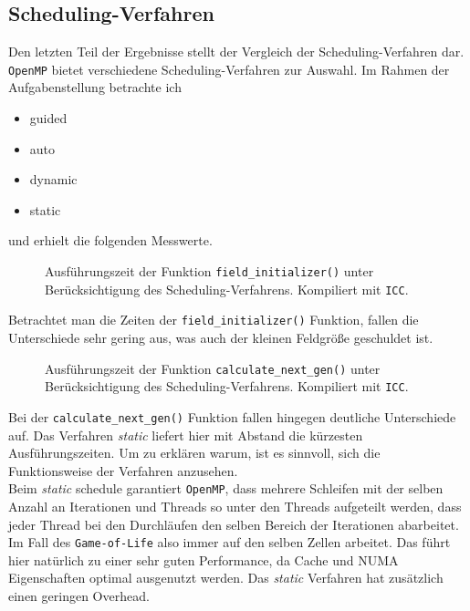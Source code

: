 \documentclass[german,plainarticle,hyperref,utf8]{zihpub}
\begin{document}
	\subsection{Scheduling-Verfahren}
	Den letzten Teil der Ergebnisse stellt der Vergleich der Scheduling-Verfahren dar. \texttt{OpenMP} bietet verschiedene Scheduling-Verfahren zur Auswahl. Im Rahmen der Aufgabenstellung betrachte ich
	\begin{itemize}
		\item guided
		\item auto
		\item dynamic
		\item static
	\end{itemize}
	und erhielt die folgenden Messwerte.
	\begin{figure}[ht]
		\begin{center}
			
		\end{center}
		\caption{Ausführungszeit der Funktion \texttt{field\_initializer()} unter Berücksichtigung des Scheduling-Verfahrens. Kompiliert mit \texttt{ICC}.}
	\end{figure}
	\newline
	Betrachtet man die Zeiten der \texttt{field\_initializer()} Funktion, fallen die Unterschiede sehr gering aus, was auch der kleinen Feldgröße geschuldet ist.
	\newpage
	\begin{figure}
		\begin{center}
			
		\end{center}
		\caption{Ausführungszeit der Funktion \texttt{calculate\_next\_gen()} unter Berücksichtigung des Scheduling-Verfahrens. Kompiliert mit \texttt{ICC}.}
	\end{figure}
	Bei der \texttt{calculate\_next\_gen()} Funktion fallen hingegen deutliche Unterschiede auf. Das Verfahren \textit{static} liefert hier mit Abstand die kürzesten Ausführungszeiten.
	Um zu erklären warum, ist es sinnvoll, sich die Funktionsweise der Verfahren anzusehen.\\
	
	Beim \textit{static} schedule garantiert \texttt{OpenMP}, dass mehrere Schleifen mit der selben Anzahl an Iterationen und Threads so unter den Threads aufgeteilt werden, dass jeder Thread bei den Durchläufen den selben Bereich der Iterationen abarbeitet. Im Fall des \texttt{Game-of-Life} also immer auf den selben Zellen arbeitet. Das führt hier natürlich zu einer sehr guten Performance, da Cache und NUMA Eigenschaften optimal ausgenutzt werden. Das \textit{static} Verfahren hat zusätzlich einen geringen Overhead.\\
	
\end{document}
